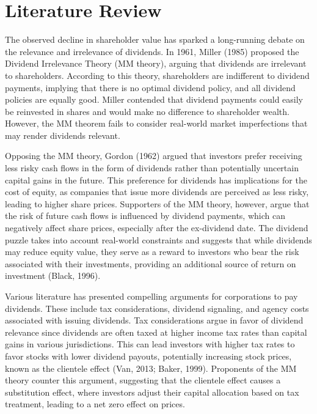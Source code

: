 \documentclass[11pt,preprint, authoryear]{elsarticle}
\numberwithin{equation}{section}
\numberwithin{figure}{section}
\numberwithin{table}{section}
\begin{document}
\hypertarget{literature-review}{%
\section*{Literature Review}\label{literature-review}}

The observed decline in shareholder value has sparked a long-running
debate on the relevance and irrelevance of dividends. In 1961, Miller
(1985) proposed the Dividend Irrelevance Theory (MM theory), arguing
that dividends are irrelevant to shareholders. According to this theory,
shareholders are indifferent to dividend payments, implying that there
is no optimal dividend policy, and all dividend policies are equally
good. Miller contended that dividend payments could easily be reinvested
in shares and would make no difference to shareholder wealth. However,
the MM theorem fails to consider real-world market imperfections that
may render dividends relevant.

Opposing the MM theory, Gordon (1962) argued that investors prefer
receiving less risky cash flows in the form of dividends rather than
potentially uncertain capital gains in the future. This preference for
dividends has implications for the cost of equity, as companies that
issue more dividends are perceived as less risky, leading to higher
share prices. Supporters of the MM theory, however, argue that the risk
of future cash flows is influenced by dividend payments, which can
negatively affect share prices, especially after the ex-dividend date.
The dividend puzzle takes into account real-world constraints and
suggests that while dividends may reduce equity value, they serve as a
reward to investors who bear the risk associated with their investments,
providing an additional source of return on investment (Black, 1996).

Various literature has presented compelling arguments for corporations
to pay dividends. These include tax considerations, dividend signaling,
and agency costs associated with issuing dividends. Tax considerations
argue in favor of dividend relevance since dividends are often taxed at
higher income tax rates than capital gains in various jurisdictions.
This can lead investors with higher tax rates to favor stocks with lower
dividend payouts, potentially increasing stock prices, known as the
clientele effect (Van, 2013; Baker, 1999). Proponents of the MM theory
counter this argument, suggesting that the clientele effect causes a
substitution effect, where investors adjust their capital allocation
based on tax treatment, leading to a net zero effect on prices.
\end{document}
